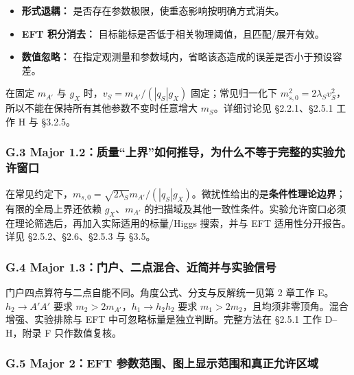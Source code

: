 \documentclass[
  chinese,
  UTF8]{ctexart}
\providecommand{\tightlist}{%
  \setlength{\itemsep}{0pt}\setlength{\parskip}{0pt}}
\begin{document}
\begin{itemize}
\tightlist
\item
  \textbf{形式退耦：} 是否存在参数极限，使重态影响按明确方式消失。
\item
  \textbf{EFT 积分消去：}
  目标能标是否低于相关物理阈值，且匹配/展开有效。
\item
  \textbf{数值忽略：}
  在指定观测量和参数域内，省略该态造成的误差是否小于预设容差。
\end{itemize}

在固定 \(m_{A'}\) 与 \(g_X\) 时，\(v_S=m_{A'}/(|q_S|g_X)\)
固定；常见归一化下
\(m_{s,0}^2=2\lambda_Sv_S^2\)，所以不能在保持所有其他参数不变时任意增大
\(m_S\)。详细讨论见 §2.2.1、§2.5.1 工作 H 与 §3.2.5。

\subsubsection{G.3 Major
1.2：质量``上界''如何推导，为什么不等于完整的实验允许窗口}\label{g.3-major-1.2ux8d28ux91cfux4e0aux754cux5982ux4f55ux63a8ux5bfcux4e3aux4ec0ux4e48ux4e0dux7b49ux4e8eux5b8cux6574ux7684ux5b9eux9a8cux5141ux8bb8ux7a97ux53e3}

在常见约定下，\(m_{s,0}=\sqrt{2\lambda_S}m_{A'}/(|q_S|g_X)\)。微扰性给出的是\textbf{条件性理论边界}；有限的全局上界还依赖
\(g_X\)、\(m_{A'}\)
的扫描域及其他一致性条件。实验允许窗口必须在理论筛选后，再加入实际适用的标量/Higgs
搜索，并与 EFT 适用性分开报告。详见 §2.5.2、§2.6、§2.5.3 与 §3.5。

\subsubsection{G.4 Major
1.3：门户、二点混合、近简并与实验信号}\label{g.4-major-1.3ux95e8ux6237ux4e8cux70b9ux6df7ux5408ux8fd1ux7b80ux5e76ux4e0eux5b9eux9a8cux4fe1ux53f7}

门户四点算符与二点自能不同。角度公式、分支与反解统一见第 2 章工作
E。\(h_2\to A'A'\) 要求 \(m_2>2m_{A'}\)，\(h_1\to h_2h_2\) 要求
\(m_1>2m_2\)，且均须非零顶角。混合增强、实验排除与 EFT
中可忽略标量是独立判断。完整方法在 §2.5.1 工作 D--H，附录 F
只作数值复核。

\subsubsection{G.5 Major 2：EFT
参数范围、图上显示范围和真正允许区域}\label{g.5-major-2eft-ux53c2ux6570ux8303ux56f4ux56feux4e0aux663eux793aux8303ux56f4ux548cux771fux6b63ux5141ux8bb8ux533aux57df}
\end{document}
